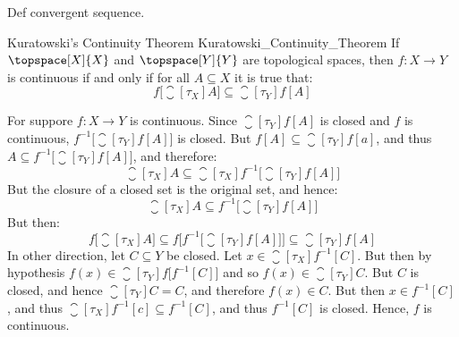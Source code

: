\documentclass{article}                                                        %
\begin{document}
        Def convergent sequence.
        \begin{ftheorem}{Kuratowski's Continuity Theorem}
                        {Kuratowski_Continuity_Theorem}
            If $\topspace[X]{X}$ and $\topspace[Y]{Y}$ are topological spaces,
            then $f:X\rightarrow{Y}$ is continuous if and only if for all
            $A\subseteq{X}$ it is true that:
            \begin{equation*}
                f\big[\closure[\tau_{X}]{A}\big]\subseteq
                \closure[\tau_{Y}]{f[A]}
            \end{equation*}
        \end{ftheorem}
        \begin{bproof}
            For suppore $f:X\rightarrow{Y}$ is continuous. Since
            $\closure[\tau_{Y}]{f[A]}$ is closed and $f$ is continuous,
            $f^{\minus{1}}\big[\closure[\tau_{Y}]{f[A]}\big]$ is closed.
            But $f[A]\subseteq\closure[\tau_{Y}]{f[a]}$, and thus
            $A\subseteq{f}^{\minus{1}}\big[\closure[\tau_{Y}]{f[A]}\big]$,
            and therefore:
            \begin{equation}
                \closure[\tau_{X}]{A}\subseteq
                \closure[\tau_{X}]
                    {{f}^{\minus{1}}\big[\closure[\tau_{Y}]{f[A]}\big]}
            \end{equation}
            But the closure of a closed set is the original set, and hence:
            \begin{equation}
                \closure[\tau_{X}]{A}\subseteq
                    f^{\minus{1}}\big[\closure[\tau_{Y}]{f[A]}\big]
            \end{equation}
            But then:
            \begin{equation}
                f\big[\closure[\tau_{X}]{A}\big]\subseteq
                f\Big[f^{\minus{1}}\big[\closure[\tau_{Y}]{f[A]}\big]\Big]
                \subseteq\closure[\tau_{Y}]{f[A]}
            \end{equation}
            In other direction, let $C\subseteq{Y}$ be closed. Let
            $x\in\closure[\tau_{X}]{f^{\minus{1}}[C]}$. But then by hypothesis
            $f(x)\in\closure[\tau_{Y}]{f\big[f^{\minus{1}}[C]\big]}$ and so
            $f(x)\in\closure[\tau_{Y}]{C}$. But $C$ is closed, and hence
            $\closure[\tau_{Y}]{C}=C$, and therefore $f(x)\in{C}$. But then
            $x\in{f}^{\minus{1}}[C]$, and thus
            $\closure[\tau_{X}]{f^{\minus{1}}[c]}\subseteq{f}^{\minus{1}}[C]$,
            and thus $f^{\minus{1}}[C]$ is closed. Hence, $f$ is continuous.
        \end{bproof}
\end{document}
